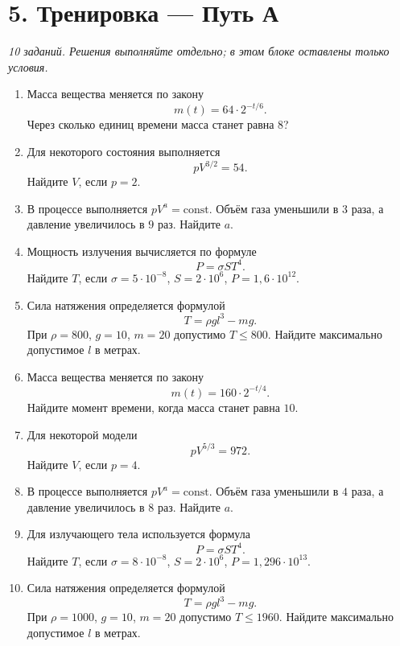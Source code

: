 \documentclass[a4paper,12pt]{article}
\begin{document}
\section*{5. Тренировка — Путь А}
\textit{10 заданий. Решения выполняйте отдельно; в этом блоке оставлены только условия.}

\begin{enumerate}
\item Масса вещества меняется по закону
\[
m(t)=64\cdot2^{-t/6}.
\]
Через сколько единиц времени масса станет равна $8$?

\item Для некоторого состояния выполняется
\[
pV^{3/2}=54.
\]
Найдите $V$, если $p=2$.

\item В процессе выполняется $pV^a=\mathrm{const}$. Объём газа уменьшили в $3$ раза, а давление увеличилось в $9$ раз. Найдите $a$.

\item Мощность излучения вычисляется по формуле
\[
P=\sigma ST^4.
\]
Найдите $T$, если $\sigma=5\cdot10^{-8}$, $S=2\cdot10^6$, $P=1{,}6\cdot10^{12}$.

\item Сила натяжения определяется формулой
\[
T=\rho g l^3-mg.
\]
При $\rho=800$, $g=10$, $m=20$ допустимо $T\le800$. Найдите максимально допустимое $l$ в метрах.

\item Масса вещества меняется по закону
\[
m(t)=160\cdot2^{-t/4}.
\]
Найдите момент времени, когда масса станет равна $10$.

\item Для некоторой модели
\[
pV^{5/3}=972.
\]
Найдите $V$, если $p=4$.

\item В процессе выполняется $pV^a=\mathrm{const}$. Объём газа уменьшили в $4$ раза, а давление увеличилось в $8$ раз. Найдите $a$.

\item Для излучающего тела используется формула
\[
P=\sigma ST^4.
\]
Найдите $T$, если $\sigma=8\cdot10^{-8}$, $S=2\cdot10^6$, $P=1{,}296\cdot10^{13}$.

\item Сила натяжения определяется формулой
\[
T=\rho g l^3-mg.
\]
При $\rho=1000$, $g=10$, $m=20$ допустимо $T\le1960$. Найдите максимально допустимое $l$ в метрах.
\end{enumerate}

\clearpage
\end{document}
